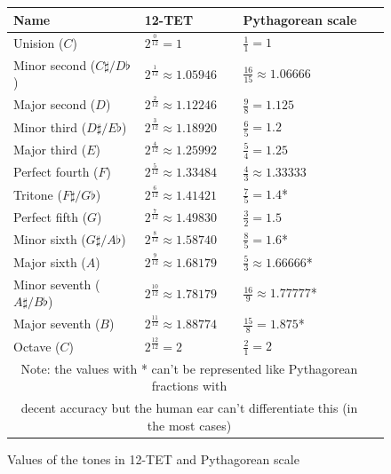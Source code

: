 \documentclass[]{article}
\begin{document}
                \begin{figure}[h]
                    \begin{center}
                        \begin{tabular}{| l | l | l | l |}
                            \hline
                            \textbf{Name} & \textbf{12-TET} & \textbf{Pythagorean scale}\\\hline
                            Unision ($C$) & $2^\frac{0}{12} = 1$ & $\frac{1}{1} = 1$ \\ \hline
                            Minor second ($C\sharp/D\flat$) & $2^\frac{1}{12} \approx 1.05946$ & $\frac{16}{15} \approx 1.06666$\\ \hline
                            Major second ($D$) & $2^\frac{2}{12} \approx 1.12246$ & $\frac{9}{8} = 1.125$ \\ \hline
                            Minor third ($D\sharp/E\flat$) & $2^\frac{3}{12} \approx 1.18920$ & $\frac{6}{5} = 1.2$ \\ \hline
                            Major third ($E$) & $2^\frac{4}{12} \approx 1.25992$ & $\frac{5}{4} = 1.25$ \\ \hline
                            Perfect fourth ($F$) & $2^\frac{5}{12} \approx 1.33484$ & $\frac{4}{3} \approx 1.33333$ \\ \hline
                            Tritone ($F\sharp/G\flat$) & $2^\frac{6}{12} \approx 1.41421$ & $\frac{7}{5} = 1.4$* \\ \hline
                            Perfect fifth ($G$) & $2^\frac{7}{12} \approx 1.49830$ & $\frac{3}{2} = 1.5$ \\ \hline
                            Minor sixth ($G\sharp/A\flat$) & $2^\frac{8}{12} \approx 1.58740$ & $\frac{8}{5} = 1.6$* \\ \hline
                            Major sixth ($A$) & $2^\frac{9}{12} \approx 1.68179$ & $\frac{5}{3} \approx 1.66666$* \\ \hline
                            Minor seventh ($A\sharp/B\flat$) & $2^\frac{10}{12} \approx 1.78179$ & $\frac{16}{9} \approx 1.77777$* \\ \hline
                            Major seventh ($B$) & $2^\frac{11}{12} \approx 1.88774$ & $\frac{15}{8} = 1.875$* \\ \hline
                            Octave ($C$) & $2^\frac{12}{12} = 2$ & $\frac{2}{1} = 2$ \\ \hline
                            \multicolumn{3}{c}{Note: the values with * can't be represented like Pythagorean fractions with}\\
                            \multicolumn{3}{c}{decent accuracy but the human ear can't differentiate this (in the most cases)}\\
                        \end{tabular}
                        \caption{Values of the tones in 12-TET and Pythagorean scale}
                    \end{center}
                \end{figure}
\end{document}
